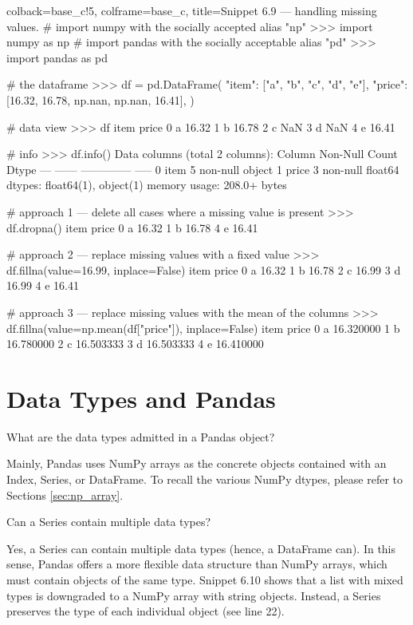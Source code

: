 \documentclass[a4paper,11pt]{book}
\newcommand{\question}[1]{%
    \begin{tcolorbox}[colback=comp_c!10,colframe=comp_c,sidebyside align=top,width=\linewidth,before skip=1ex]
        #1
    \end{tcolorbox}
    \switchcolumn%
}
\newcommand{\note}[1]{%
    \begin{tcolorbox}[colback=white!0,colframe=white!10,width=\linewidth,before skip=1ex]
        #1
    \end{tcolorbox}
}
\begin{document}
\begin{pythoncode}[linenos=True]{colback=base_c!5, colframe=base_c, title=\sffamily Snippet 6.9 --- handling missing values}.
# import numpy with the socially accepted alias "np"
>>> import numpy as np
# import pandas with the socially acceptable alias "pd"
>>> import pandas as pd 

# the dataframe
>>> df = pd.DataFrame(
	{
	    "item": ["a", "b", "c", "d", "e"],
	    "price": [16.32, 16.78, np.nan, np.nan, 16.41],
	}
)

# data view 
>>> df
  item  price
0    a  16.32
1    b  16.78
2    c    NaN
3    d    NaN
4    e  16.41

# info 
>>> df.info()
Data columns (total 2 columns):
     Column  Non-Null Count  Dtype  
---  ------  --------------  -----  
 0   item    5 non-null      object 
 1   price   3 non-null      float64
dtypes: float64(1), object(1)
memory usage: 208.0+ bytes

# approach 1 --- delete all cases where a missing value is present
>>> df.dropna()
  item  price
0    a  16.32
1    b  16.78
4    e  16.41

# approach 2 --- replace missing values with a fixed value
>>> df.fillna(value=16.99, inplace=False)
  item  price
0    a  16.32
1    b  16.78
2    c  16.99
3    d  16.99
4    e  16.41

# approach 3 --- replace missing values with the mean of the columns
>>> df.fillna(value=np.mean(df["price"]), inplace=False)
  item      price
0    a  16.320000
1    b  16.780000
2    c  16.503333
3    d  16.503333
4    e  16.410000
\end{pythoncode}

\section{Data Types and Pandas} 

\begin{paracol}{2}
	\question{\raggedright What are the data types admitted in a Pandas object?}
	\note{Mainly, Pandas uses NumPy arrays as the concrete objects contained with an Index, Series, or DataFrame. To recall the various NumPy dtypes, please refer to Sections \ref{sec:np_array}.}
\end{paracol}

\begin{paracol}{2}
	\question{\raggedright Can a Series contain multiple data types?}
	\note{Yes, a Series can contain multiple data types (hence, a DataFrame can). In this sense, Pandas offers a more flexible data structure than NumPy arrays, which must contain objects of the same type. Snippet 6.10 shows that a list with mixed types is downgraded to a NumPy array with string objects. Instead, a Series preserves the type of each individual object (see line 22).}
\end{paracol}
\clearpage
\end{document}

